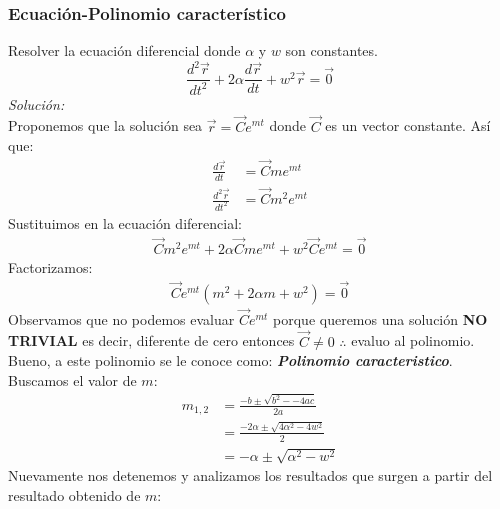 \documentclass[12pt,openany]{book}
\begin{document}
			\subsubsection{Ecuaci\'on-Polinomio caracter\'istico}
				Resolver la ecuaci\'on diferencial donde $\alpha$ y $w$ son constantes.
				$$
					\frac{d^{2}\vec{r}}{dt^{2}}+2\alpha \frac{d\vec{r}}{dt}+ w^{2}\vec{r}=\vec{0}
				$$
				\noindent\textsl{Soluci\'on:}\\
				Proponemos que la soluci\'on sea $\vec{r}=\vec{C}e^{mt}$ donde $\vec{C}$ es un vector constante. As\'i que:
				\begin{equation*}
					\begin{split}
						\frac{d\vec{r}}{dt}&=\vec{C}me^{mt} \\
						\frac{d^{2}\vec{r}}{dt^{2}}&=\vec{C}m^{2}e^{mt}
					\end{split}
				\end{equation*}
				Sustituimos en la ecuaci\'on diferencial:
				\begin{equation*}
					\begin{split}
						\vec{C}m^{2}e^{mt}+2\alpha\vec{C}me^{mt}+w^{2}\vec{C}e^{mt}=\vec{0}
					\end{split}
				\end{equation*}
				Factorizamos:
				\begin{equation*}
					\begin{split}
						\vec{C}e^{mt}\left(m^{2}+2\alpha m+w^{2}\right)=\vec{0}
					\end{split}
				\end{equation*}
				Observamos que no podemos evaluar $\vec{C}e^{mt}$ porque queremos una soluci\'on \textbf{NO TRIVIAL} es decir,
				diferente de cero entonces $\vec{C}\neq0$ $\therefore$ evaluo al polinomio.			\\
				Bueno, a este polinomio se le conoce como: \textsl{\textbf{Polinomio caracteristico}}.	\\
				Buscamos el valor de $m$:
				\begin{equation*}
					\begin{split}
						m_{1,2}&=\frac{-b\pm\sqrt{b^{2}--4ac}}{2a} 		 		\\
							   &=\frac{-2\alpha\pm\sqrt{4\alpha^{2}-4w^{2}}}{2}	\\
							   &=-\alpha\pm\sqrt{\alpha^{2}-w^{2}} 
					\end{split}
				\end{equation*}
				Nuevamente nos detenemos y analizamos los resultados que surgen a partir del resultado obtenido de $m$:
\end{document}

